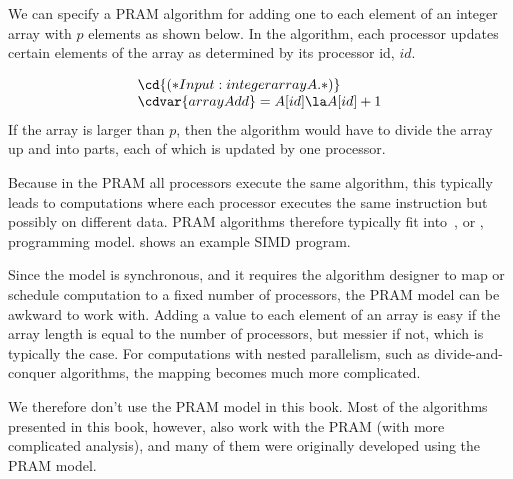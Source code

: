 \begin{example}
\label{ex:analysis::models::pram-array-add}
We can specify a PRAM algorithm for adding one to each element of an
integer array with $p$ elements as shown below.  In the algorithm,
each processor updates certain elements of the array as determined by
its processor id, $id$.

\[
\begin{array}{l}
\cd{(* Input: integer array A. *)}
\\
\cdvar{arrayAdd} =  A[id] \la A[id]+1
\end{array}
\]
If the array is larger than $p$, then the algorithm would have to
divide the array up and into parts, each of which is updated by one
processor.
\end{example}

\begin{gram}
Because in the PRAM all processors execute the same algorithm, this
typically leads to computations where each processor executes the same
instruction but possibly on different data.   PRAM algorithms
therefore typically fit into~, or , programming model.
%
 shows an example SIMD program.

%
\end{gram}


\begin{gram}
Since the model is synchronous, and it requires the algorithm designer to map
or schedule computation to a fixed number of processors, the PRAM model can be awkward
to work with.
%
Adding a value to each element of an array is easy if the array
length is equal to the number of processors, but messier if not, which is
typically the case.
%
For computations with nested parallelism, such as divide-and-conquer
algorithms, the mapping becomes much more complicated.

We therefore don't use the PRAM model in this book.
%
Most of the algorithms presented in this book, however, also work with the
PRAM (with more complicated analysis), and many of them were
originally developed using the PRAM model.
\end{gram}

